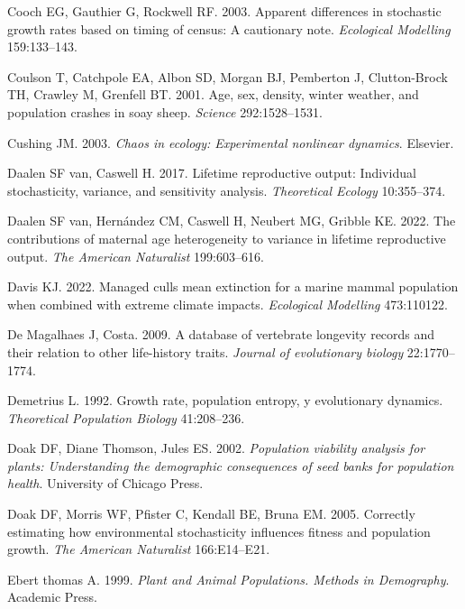 \documentclass[
  12pt,
  letterpaper,
]{book}
\newlength{\cslhangindent}
\newenvironment{CSLReferences}[2] %
 {\begin{list}{}{%
  \setlength{\itemindent}{0pt}
  \setlength{\leftmargin}{0pt}
  \setlength{\parsep}{0pt}
  \ifodd #1
   \setlength{\leftmargin}{\cslhangindent}
   \setlength{\itemindent}{-1\cslhangindent}
  \fi
  \setlength{\itemsep}{#2\baselineskip}}}
 {\end{list}}
\begin{document}
\begin{CSLReferences}{1}{0}
Cooch EG, Gauthier G, Rockwell RF. 2003. Apparent differences in
stochastic growth rates based on timing of census: A cautionary note.
\emph{Ecological Modelling} 159:133--143.

Coulson T, Catchpole EA, Albon SD, Morgan BJ, Pemberton J, Clutton-Brock
TH, Crawley M, Grenfell BT. 2001. Age, sex, density, winter weather, and
population crashes in soay sheep. \emph{Science} 292:1528--1531.

Cushing JM. 2003. \emph{Chaos in ecology: Experimental nonlinear
dynamics}. Elsevier.

Daalen SF van, Caswell H. 2017. Lifetime reproductive output: Individual
stochasticity, variance, and sensitivity analysis. \emph{Theoretical
Ecology} 10:355--374.

Daalen SF van, Hernández CM, Caswell H, Neubert MG, Gribble KE. 2022.
The contributions of maternal age heterogeneity to variance in lifetime
reproductive output. \emph{The American Naturalist} 199:603--616.

Davis KJ. 2022. Managed culls mean extinction for a marine mammal
population when combined with extreme climate impacts. \emph{Ecological
Modelling} 473:110122.

De Magalhaes J, Costa. 2009. A database of vertebrate longevity records
and their relation to other life-history traits. \emph{Journal of
evolutionary biology} 22:1770--1774.

Demetrius L. 1992. Growth rate, population entropy, y evolutionary
dynamics. \emph{Theoretical Population Biology} 41:208--236.

Doak DF, Diane Thomson, Jules ES. 2002. \emph{Population viability
analysis for plants: Understanding the demographic consequences of seed
banks for population health}. University of Chicago Press.

Doak DF, Morris WF, Pfister C, Kendall BE, Bruna EM. 2005. Correctly
estimating how environmental stochasticity influences fitness and
population growth. \emph{The American Naturalist} 166:E14--E21.

Ebert thomas A. 1999. \emph{Plant and {A}nimal {P}opulations. {M}ethods
in {D}emography}. Academic Press.


\end{CSLReferences}
\end{document}
